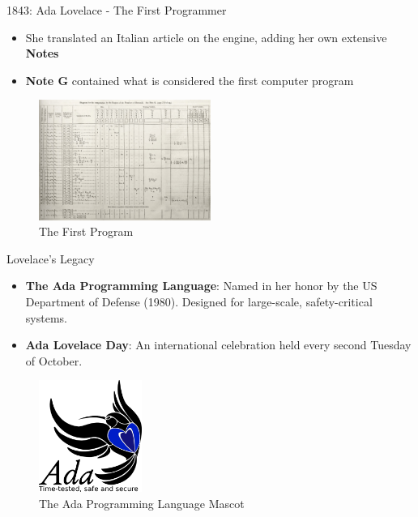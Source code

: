 \documentclass{beamer}
\begin{document}
\begin{frame}[t]{1843: Ada Lovelace - The First Programmer}
        \begin{itemize}
            \item She translated an Italian article on the engine, adding her own extensive \textbf{Notes}
            \item \textbf{Note G} contained what is considered the first computer program
        \end{itemize}
        \begin{figure}[b]
            \centering
            \includegraphics[width=0.5\textwidth]{images/Diagram_for_the_computation_of_Bernoulli_numbers.jpg}
            \caption{The First Program}
        \end{figure}
\end{frame}


\begin{frame}[t]{Lovelace's Legacy}
\begin{itemize}
    \item \textbf{The Ada Programming Language}: Named in her honor by the US Department of Defense (1980). Designed for large-scale, safety-critical systems.
    \item \textbf{Ada Lovelace Day}: An international celebration held every second Tuesday of October.
\end{itemize}


    \begin{figure}[b]
        \centering
        \includegraphics[width=0.3\textwidth]{images/Ada_logo.png}
        \caption{The Ada Programming Language Mascot}
    \end{figure}
\end{frame}
\end{document}
